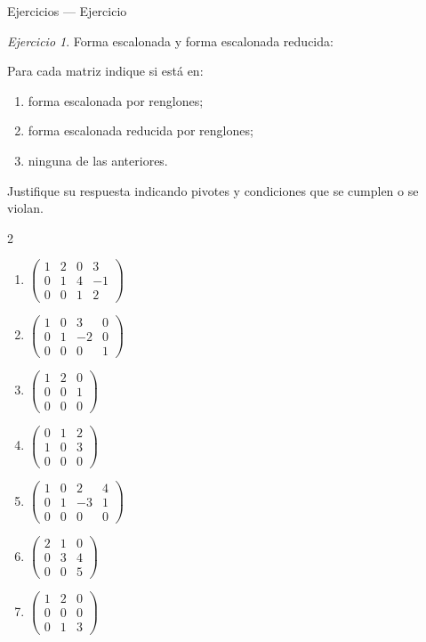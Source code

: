 \documentclass[aspectratio=169,11pt]{beamer}
\theoremstyle{remark}
\newtheorem{Ejer}[definicion]{Ejercicio}
\begin{document}
\begin{frame}[shrink=5]{Ejercicios — Ejercicio}
\footnotesize
\begin{Ejer} Forma escalonada y forma escalonada reducida:

Para cada matriz indique si está en:
\begin{enumerate}[label=\alph*)]
\item forma escalonada por renglones;
\item forma escalonada reducida por renglones;
\item ninguna de las anteriores.
\end{enumerate}
Justifique su respuesta indicando pivotes y condiciones que se cumplen o se violan.

\begin{multicols}{2}
\begin{enumerate}[resume]
\item $\begin{pmatrix}1&2&0&3\\0&1&4&-1\\0&0&1&2\end{pmatrix}$
\item $\begin{pmatrix}1&0&3&0\\0&1&-2&0\\0&0&0&1\end{pmatrix}$
\item $\begin{pmatrix}1&2&0\\0&0&1\\0&0&0\end{pmatrix}$
\item $\begin{pmatrix}0&1&2\\1&0&3\\0&0&0\end{pmatrix}$
\item $\begin{pmatrix}1&0&2&4\\0&1&-3&1\\0&0&0&0\end{pmatrix}$
\item $\begin{pmatrix}2&1&0\\0&3&4\\0&0&5\end{pmatrix}$
\item $\begin{pmatrix}1&2&0\\0&0&0\\0&1&3\end{pmatrix}$

\end{enumerate}
\end{multicols}
\end{Ejer}
\end{frame}
\end{document}
